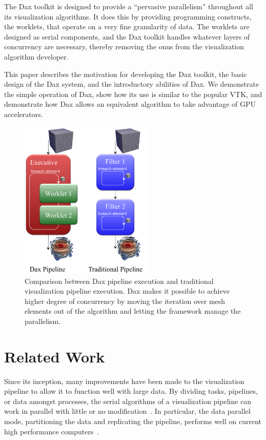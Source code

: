 \documentclass{vgtc}                          %
\newcommand*{\lcite}[1]{~\cite{#1}}
\begin{document}
The Dax toolkit is designed to provide a ``pervasive parallelism''
throughout all its visualization algorithms.  It does this by providing
programming constructs, the worklets, that operate on a very fine
granularity of data.  The worklets are designed as serial components, and
the Dax toolkit handles whatever layers of concurrency are necessary,
thereby removing the onus from the visualization algorithm developer.

This paper describes the motivation for developing the Dax toolkit, the
basic design of the Dax system, and the introductory abilities of Dax.  We
demonstrate the simple operation of Dax, show how its use is similar to the
popular VTK, and demonstrate how Dax allows an equivalent algorithm to take
advantage of GPU accelerators.

\begin{figure}
  \centering
  \includegraphics[width=2.5in]{images/DaxPipelineVsTraditionalPipeline}
  \caption{Comparison between Dax pipeline execution and traditional
    visualization pipeline execution. Dax makes it possible to achieve higher
    degree of concurrency by moving the iteration over mesh elements out of the
    algorithm and letting the framework manage the parallelism.}
  \label{fig:DaxPipelineVsTraditionalPipeline}
\end{figure}

\section{Related Work}
\label{sec:RelatedWork}

Since its inception, many improvements have been made to the visualization
pipeline to allow it to function well with large data.  By dividing tasks,
pipelines, or data amongst processes, the serial algorithms of a
visualization pipeline can work in parallel with little or no
modification\lcite{Ahrens00}.  In particular, the data parallel
mode, partitioning the data and replicating the pipeline, performs
well on current high performance computers\lcite{Cedilnik06}.
\end{document}
